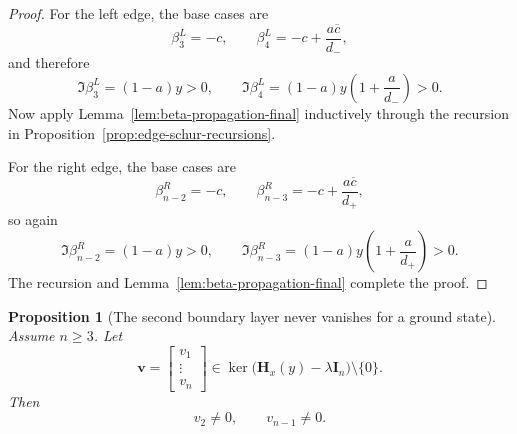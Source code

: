 \documentclass[11pt]{article}
\newtheorem{proposition}[theorem]{Proposition}
\begin{document}
\begin{proof}
For the left edge, the base cases are
\[
\beta_3^L=-c,
\qquad
\beta_4^L=-c+\frac{a\overline c}{d_-},
\]
and therefore
\[
\Im\beta_3^L=(1-a)y>0,
\qquad
\Im\beta_4^L=(1-a)y\left(1+\frac{a}{d_-}\right)>0.
\]
Now apply Lemma~\ref{lem:beta-propagation-final} inductively through the recursion in
Proposition~\ref{prop:edge-schur-recursions}.

For the right edge, the base cases are
\[
\beta_{n-2}^R=-c,
\qquad
\beta_{n-3}^R=-c+\frac{a\overline c}{d_+},
\]
so again
\[
\Im\beta_{n-2}^R=(1-a)y>0,
\qquad
\Im\beta_{n-3}^R=(1-a)y\left(1+\frac{a}{d_+}\right)>0.
\]
The recursion and Lemma~\ref{lem:beta-propagation-final} complete the proof.
\end{proof}

\begin{proposition}[The second boundary layer never vanishes for a ground state]\label{prop:v2-nonzero-groundstate}
Assume \(n\ge 3\). Let
\[
\mathbf v=
\begin{bmatrix}
v_1\\ \vdots\\ v_n
\end{bmatrix}\in \ker\bigl(\mathbf H_x(y)-\lambda\mathbf I_n\bigr)
\setminus\{0\}.
\]
Then
\[
v_2\neq 0,
\qquad
v_{n-1}\neq 0.
\]
\end{proposition}
\end{document}
